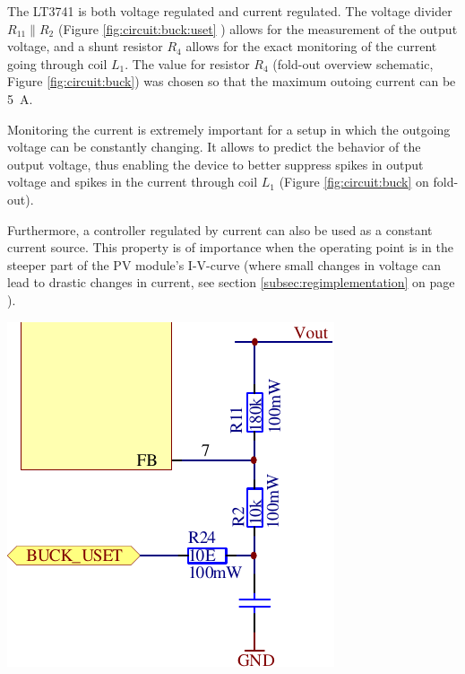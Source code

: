 \begin{minipage}{0.5\textwidth}
    The LT3741  is both voltage  regulated and current  regulated. The voltage
    divider  $R_{11}  \parallel  R_2$  (Figure  \ref{fig:circuit:buck:uset}  )
    allows for  the measurement of  the output  voltage, and a  shunt resistor
    $R_4$ allows  for the exact monitoring  of the current going  through coil
    $L_1$. The value  for resistor $R_4$ (fold-out  overview schematic, Figure
    \ref{fig:circuit:buck}) was chosen so that the maximum outoing current can
    be \SI{5}{\ampere}.

    Monitoring the  current is extremely  important for  a setup in  which the
    outgoing  voltage can  be constantly  changing. It allows  to predict  the
    behavior  of  the output  voltage,  thus  enabling  the device  to  better
    suppress spikes in  output voltage and spikes in the  current through coil
    $L_1$ (Figure \ref{fig:circuit:buck} on fold-out).

    Furthermore,  a  controller   regulated  by  current  can   also  be  used
    as  a  constant  current  source. This  property  is  of  importance  when
    the  operating  point   is  in  the  steeper  part  of   the  PV  module's
    I-V-curve  (where   small  changes   in  voltage   can  lead   to  drastic
    changes  in current,  see section  \ref{subsec:regimplementation} on  page
    \pageref{subsec:regimplementation}).

\end{minipage}
\begin{minipage}{0.5\textwidth}
    \center
    \includegraphics[width=.85\textwidth]{images/circuit/buck-uset.pdf}
    \label{fig:circuit:buck:uset}
\end{minipage}

